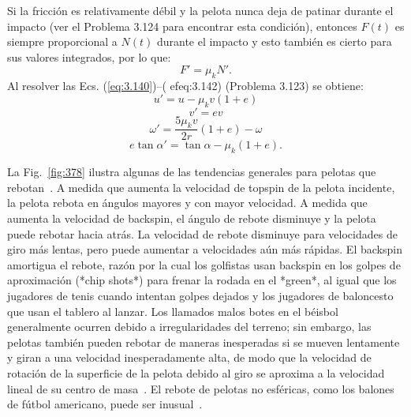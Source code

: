\documentclass[12pt]{book}
\begin{document}
Si la fricción es relativamente débil y la pelota nunca deja de patinar durante el impacto (ver el Problema 3.124 para encontrar esta condición), entonces $F(t)$ es siempre proporcional a $N(t)$ durante el impacto y esto también es cierto para sus valores integrados, por lo que:
\begin{equation}
F' = \mu_k N'.
\label{eq:3.149}
\end{equation}
Al resolver las Ecs. (\ref{eq:3.140})--(
ef{eq:3.142}) (Problema 3.123) se obtiene:
\begin{equation}
u' = u - \mu_k v(1 + e)
\label{eq:3.150}
\end{equation}
\begin{equation}
v' = e v
\label{eq:3.151}
\end{equation}
\begin{equation}
\omega' = \frac{5\mu_k v}{2r}(1 + e) - \omega
\label{eq:3.152}
\end{equation}
\begin{equation}
e \tan \alpha' = \tan \alpha - \mu_k (1 + e).
\label{eq:3.153}
\end{equation}

La Fig.~\ref{fig:378} ilustra algunas de las tendencias generales para pelotas que rebotan~\cite{ref36}. A medida que aumenta la velocidad de topspin de la pelota incidente, la pelota rebota en ángulos mayores y con mayor velocidad. A medida que aumenta la velocidad de backspin, el ángulo de rebote disminuye y la pelota puede rebotar hacia atrás. La velocidad de rebote disminuye para velocidades de giro más lentas, pero puede aumentar a velocidades aún más rápidas. El backspin amortigua el rebote, razón por la cual los golfistas usan backspin en los golpes de aproximación (*chip shots*) para frenar la rodada en el *green*, al igual que los jugadores de tenis cuando intentan golpes dejados y los jugadores de baloncesto que usan el tablero al lanzar. Los llamados malos botes en el béisbol generalmente ocurren debido a irregularidades del terreno; sin embargo, las pelotas también pueden rebotar de maneras inesperadas si se mueven lentamente y giran a una velocidad inesperadamente alta, de modo que la velocidad de rotación de la superficie de la pelota debido al giro se aproxima a la velocidad lineal de su centro de masa~\cite{ref16}. El rebote de pelotas no esféricas, como los balones de fútbol americano, puede ser inusual~\cite{ref16,ref29}.
\end{document}
